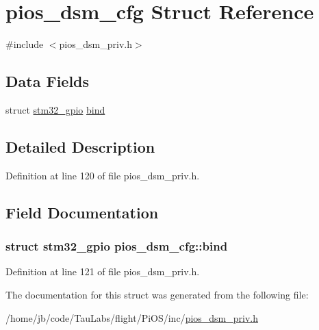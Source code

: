 \hypertarget{structpios__dsm__cfg}{\section{pios\-\_\-dsm\-\_\-cfg \-Struct \-Reference}
\label{structpios__dsm__cfg}
}


{\ttfamily \#include $<$pios\-\_\-dsm\-\_\-priv.\-h$>$}

\subsection*{\-Data \-Fields}
\begin{DoxyCompactItemize}
\item 
struct \hyperlink{structstm32__gpio}{stm32\-\_\-gpio} \hyperlink{structpios__dsm__cfg_aa476519b30ef3d42a0abba5ce8498805}{bind}
\end{DoxyCompactItemize}


\subsection{\-Detailed \-Description}


\-Definition at line 120 of file pios\-\_\-dsm\-\_\-priv.\-h.



\subsection{\-Field \-Documentation}
\hypertarget{structpios__dsm__cfg_aa476519b30ef3d42a0abba5ce8498805}{
\subsubsection[{bind}]{\setlength{\rightskip}{0pt plus 5cm}struct {\bf stm32\-\_\-gpio} {\bf pios\-\_\-dsm\-\_\-cfg\-::bind}}}\label{structpios__dsm__cfg_aa476519b30ef3d42a0abba5ce8498805}


\-Definition at line 121 of file pios\-\_\-dsm\-\_\-priv.\-h.



\-The documentation for this struct was generated from the following file\-:\begin{DoxyCompactItemize}
\item 
/home/jb/code/\-Tau\-Labs/flight/\-Pi\-O\-S/inc/\hyperlink{pios__dsm__priv_8h}{pios\-\_\-dsm\-\_\-priv.\-h}\end{DoxyCompactItemize}
